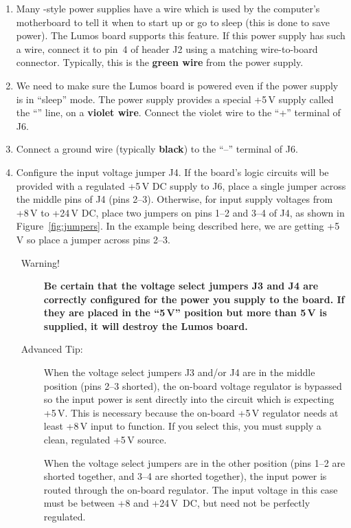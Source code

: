 \documentclass[letterpaper,twoside,onecolumn,openright,final]{memoir}
\begin{document}
\begin{enumerate}
	\item	Many -style power supplies have a wire which is used by the computer's motherboard
		to tell it when to start up or go to sleep (this is done to save power).  The Lumos
		board supports this feature.  If this power supply has such a wire, 
		connect it to pin~4 of header J2 using a matching wire-to-board connector.
		Typically, this is the {\bfseries green wire} from the power supply.  
	\item	We need to make sure the Lumos board is powered even if the power supply is in %
		``sleep'' %
		mode.  The power supply provides a special +5\,V supply called the 
		``'' line,
		on a {\bfseries violet wire}.  Connect the violet wire to the ``+'' terminal of J6.

	\item	Connect a ground wire (typically {\bfseries black}) to the ``--'' terminal of J6.

	\item\label{s:pwrjump}
		Configure the input voltage jumper J4.  If the board's logic circuits will be provided 
		with a regulated
		+5\,V DC supply to J6, place a single jumper across the middle pins of J4 (pins 2--3).  
		Otherwise, for input 
		supply voltages from +8\,V to +24\,V DC, place two jumpers on pins 1--2 and 3--4 of J4,
		as shown in Figure~\ref{fig:jumpers}.  In the example being described here, we are
		getting +5\,V so place a jumper across pins 2--3.
		\begin{description}
			\item[\HandRight\ Warning!]
				{\bfseries Be certain that the voltage select jumpers J3 and J4
				are correctly configured for the power you supply to the board.  If
				they are placed in the ``5\,V'' position but more than 5\,V is 
				supplied, it will destroy the Lumos board.}
			\item[\HandRight\ Advanced Tip:] 
				When the voltage select jumpers J3 and/or J4 
				are in the middle position
				(pins 2--3 shorted), the on-board voltage regulator is bypassed so the
				input power is sent directly into the circuit which is expecting +5\,V.
				This is necessary because the on-board +5\,V regulator needs at least
				+8\,V input to function.  If you select this, you must supply a clean,
				regulated +5\,V source.

				When the voltage select jumpers are in the other position (pins 1--2 are
				shorted together, and 3--4 are shorted together), the input power is routed
				through the on-board regulator.  The input voltage in this case must be
				between +8 and +24\,V~DC, but need not be perfectly regulated.
		\end{description}
\end{enumerate}
\end{document}
